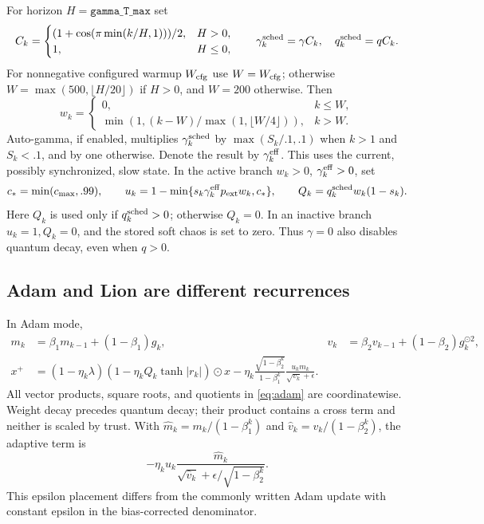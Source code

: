 \documentclass[11pt]{article}
\theoremstyle{definition}
\theoremstyle{remark}
\begin{document}
For horizon $H=\texttt{gamma\_T\_max}$ set
\[
 C_k=\begin{cases}(1+\cos(\pi\min(k/H,1)))/2,&H>0,\\1,&H\le0,\end{cases}
 \qquad \gamma_k^{\rm sched}=\gamma C_k,\quad q_k^{\rm sched}=q C_k.
\]
For nonnegative configured warmup $W_{\rm cfg}$ use $W=W_{\rm cfg}$; otherwise
$W=\max(500,\lfloor H/20\rfloor)$ if $H>0$, and $W=200$ otherwise. Then
\[
 w_k=\begin{cases}0,&k\le W,\\
 \min(1,(k-W)/\max(1,\lfloor W/4\rfloor)),&k>W.
 \end{cases}
\]
Auto-gamma, if enabled, multiplies $\gamma_k^{\rm sched}$ by
$\max(S_k/.1,.1)$ when $k>1$ and $S_k<.1$, and by one otherwise. Denote the
result by $\gamma_k^{\rm eff}$. This uses the current, possibly synchronized,
slow state. In the active branch $w_k>0$, $\gamma_k^{\rm eff}>0$, set
\begin{equation}\label{eq:trust}
 c_* =\min(c_{\max},.99),\qquad
 u_k=1-\min\{s_k\gamma_k^{\rm eff}p_{\rm ext}w_k,c_*\},\qquad
 Q_k=q_k^{\rm sched}w_k(1-s_k).
\end{equation}
Here $Q_k$ is used only if $q_k^{\rm sched}>0$; otherwise $Q_k=0$.
In an inactive branch $u_k=1,Q_k=0$, and the stored soft chaos is set to zero.
Thus $\gamma=0$ also disables quantum decay, even when $q>0$.

\subsection{Adam and Lion are different recurrences}
In Adam mode,
\begin{align}
 m_k&=\beta_1m_{k-1}+(1-\beta_1)g_k,&
 v_k&=\beta_2v_{k-1}+(1-\beta_2)g_k^{\odot2},\label{eq:moments}\\
 x^+&=(1-\eta_k\lambda)
       (1-\eta_k Q_k\tanh|r_k|)\odot x
 -\eta_k\frac{\sqrt{1-\beta_2^k}}{1-\beta_1^k}
      \frac{u_km_k}{\sqrt{v_k}+\epsilon}.\label{eq:adam}
\end{align}
All vector products, square roots, and quotients in \eqref{eq:adam} are
coordinatewise. Weight decay precedes quantum decay; their product contains a
cross term and neither is scaled by trust. With $\widehat m_k=m_k/(1-\beta_1^k)$
and $\widehat v_k=v_k/(1-\beta_2^k)$, the adaptive term is
\begin{equation}\label{eq:epsilon}
 -\eta_k u_k\frac{\widehat m_k}
  {\sqrt{\widehat v_k}+\epsilon/\sqrt{1-\beta_2^k}}.
\end{equation}
This epsilon placement differs from the commonly written Adam update with
constant epsilon in the bias-corrected denominator.
\end{document}
